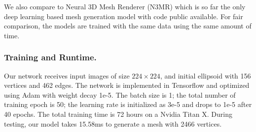 \documentclass[runningheads]{llncs}
\begin{document}
We also compare to Neural 3D Mesh Renderer (N3MR) \cite{KatoUH2018} which is so far the only deep learning based mesh generation model with code public available. For fair comparison, the models are trained with the same data using the same amount of time.

\subsubsection{Training and Runtime.} Our network receives input images of size $224\times 224$, and initial ellipsoid with 156 vertices and 462 edges. The network is implemented in Tensorflow and optimized using Adam with weight decay 1e-5. The batch size is 1; the total number of training epoch is 50; the learning rate is initialized as 3e-5 and drops to 1e-5 after 40 epochs. The total training time is 72 hours on a Nvidia Titan X. During testing, our model takes 15.58ms to generate a mesh with 2466 vertices.
\end{document}
